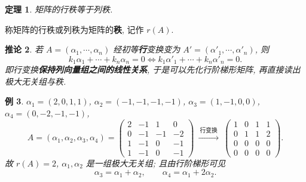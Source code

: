 \documentclass[UTF8,11pt]{ctexart}
\theoremstyle{cnthm}
\newtheorem{thm}{定理}[section]
\newtheorem{cor}[thm]{推论}
\newtheorem{exa}[thm]{例}
\begin{document}
\begin{thm}
矩阵的行秩等于列秩.
\end{thm}

称矩阵的行秩或列秩为矩阵的\textbf{秩}, 记作 $r(A)$.

\begin{cor}
若 $A=(\alpha_1,\cdots,\alpha_n)$ 经初等\textbf{行}变换变为 $A'=(\alpha'_1,\cdots,\alpha'_n)$, 则
\[
k_1\alpha_1+\cdots+k_n\alpha_n=0
\iff
k_1\alpha'_1+\cdots+k_n\alpha'_n=0 .
\]
即行变换\textbf{保持列向量组之间的线性关系}, 于是可以先化行阶梯形矩阵, 再直接读出极大无关组与秩.
\end{cor}

\begin{exa}
$\alpha_1=(2,0,1,1)$, $\alpha_2=(-1,-1,-1,-1)$, $\alpha_3=(1,-1,0,0)$, $\alpha_4=(0,-2,-1,-1)$,
\[
A=(\alpha_1,\alpha_2,\alpha_3,\alpha_4)=
\begin{pmatrix}
2&-1&1&0\\
0&-1&-1&-2\\
1&-1&0&-1\\
1&-1&0&-1
\end{pmatrix}
\ \xrightarrow{\ \text{行变换}\ }\
\begin{pmatrix}
1&0&1&1\\
0&1&1&2\\
0&0&0&0\\
0&0&0&0
\end{pmatrix}.
\]
故 $r(A)=2$, $\alpha_1,\alpha_2$ 是一组极大无关组; 且由行阶梯形可见
\[
\alpha_3=\alpha_1+\alpha_2,\qquad \alpha_4=\alpha_1+2\alpha_2 .
\]
\end{exa}
\end{document}
